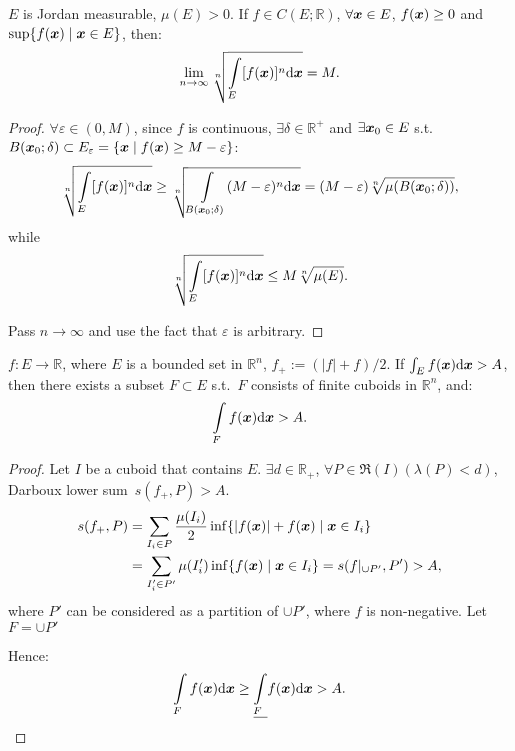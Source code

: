 \documentclass[openany]{book}
\begin{document}
\begin{theorem}
	\label{theorem: limit of p-norm}
	$E$ is Jordan measurable, $\mu(E) > 0$. 
	If $f \in C(E; \mathbb R)$, $\forall \boldsymbol{x} \in E$, $f(\boldsymbol{x}) \geq 0$ and $\sup \{f(\boldsymbol{x}) \mid \boldsymbol{x} \in E\}$, then:
	\begin{equation*}
		\lim_{n \to \infty} \sqrt[n]{\int\limits_E [f(\boldsymbol{x})]^n \mathrm{d} \boldsymbol{x}}
		= M.
	\end{equation*}
\end{theorem}
\begin{proof}
	$\forall \varepsilon \in (0, M)$, since $f$ is continuous, $\exists \delta \in \mathbb R^+$ and $\exists \boldsymbol{x}_0 \in E$ s.t.\ $B(\boldsymbol{x}_0; \delta) \subset E_\varepsilon = \{\boldsymbol{x} \mid f(\boldsymbol{x}) \geq M - \varepsilon\}$:
	\begin{equation*}
		\sqrt[n]{\int\limits_E [f(\boldsymbol{x})]^n \mathrm{d} \boldsymbol{x}} \geq \sqrt[n]{\int\limits_{B(\boldsymbol{x}_0; \delta)} (M - \varepsilon)^n \mathrm{d} \boldsymbol{x}}
		= (M - \varepsilon) \sqrt[n]{\mu(B(\boldsymbol{x}_0; \delta))},
	\end{equation*}
	while
	\begin{equation*}
		\sqrt[n]{\int\limits_E [f(\boldsymbol{x})]^n \mathrm{d} \boldsymbol{x}} \leq M \sqrt[n]{\mu(E)}.
	\end{equation*}

	Pass $n \to \infty$ and use the fact that $\varepsilon$ is arbitrary.
\end{proof}

\begin{theorem}
	\label{theorem: positive part of the integral}
	$f \colon E \to \mathbb R$, where $E$ is a bounded set in $\mathbb R^n$, $f_+ := (|f| + f)/2$. 
	If $\int_E f(\boldsymbol{x}) \mathrm{d} \boldsymbol{x} > A$, then there exists a subset $F \subset E$ s.t.\ $F$ consists of finite cuboids in $\mathbb R^n$, and:
	\begin{equation*}
		\int\limits_F f(\boldsymbol{x}) \mathrm{d} \boldsymbol{x} > A.
	\end{equation*}
\end{theorem}
\begin{proof}
	Let $I$ be a cuboid that contains $E$.
	$\exists d \in \mathbb R_+$, $\forall P \in \mathfrak R(I) (\lambda(P) < d)$, Darboux lower sum~$s(f_+, P) > A$. 
	\begin{align*}
		s(f_+, P) &= \sum_{I_i \in P} \frac{\mu(I_i)}{2} \inf\{|f(\boldsymbol{x})| + f(\boldsymbol{x}) \mid \boldsymbol{x} \in I_i\} 
		\\
		&= \sum_{I'_i \in P'} \mu(I'_i) \inf\{f(\boldsymbol{x}) \mid \boldsymbol{x} \in I_i\}
		= s(f|_{\cup P'}, P') > A,
	\end{align*}
	where $P'$ can be considered as a partition of $\cup P'$, where $f$ is non-negative.
	Let $F = \cup P'$

	Hence:
	\begin{equation*}
		\int\limits_F f(\boldsymbol{x}) \mathrm{d} \boldsymbol{x} \geq \underline{\int\limits_F} f(\boldsymbol{x}) \mathrm{d} \boldsymbol{x} > A.
	\end{equation*}
\end{proof}
\end{document}
